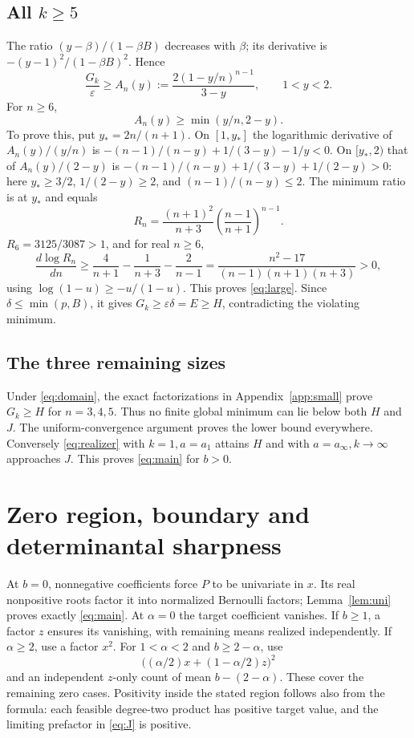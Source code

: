 \documentclass[11pt]{article}
\newcommand{\eps}{\varepsilon}
\begin{document}
\subsection{All $k\ge5$}
The ratio $(y-\beta)/(1-\beta B)$ decreases with $\beta$; its
derivative is $-(y-1)^2/(1-\beta B)^2$. Hence
\[
 \frac{G_k}{\eps}\ge A_n(y):=
 \frac{2(1-y/n)^{n-1}}{3-y},\qquad 1<y<2.
\]
For $n\ge6$,
\begin{equation}\label{eq:large}
 A_n(y)\ge\min(y/n,2-y).
\end{equation}
To prove this, put $y_*=2n/(n+1)$. On $[1,y_*]$ the logarithmic
derivative of $A_n(y)/(y/n)$ is
$-(n-1)/(n-y)+1/(3-y)-1/y<0$.
On $[y_*,2)$ that of $A_n(y)/(2-y)$ is
$-(n-1)/(n-y)+1/(3-y)+1/(2-y)>0$:
here $y_*\ge3/2$, $1/(2-y)\ge2$, and $(n-1)/(n-y)\le2$.
The minimum ratio is at $y_*$ and equals
\[
 R_n=\frac{(n+1)^2}{n+3}
 \left(\frac{n-1}{n+1}\right)^{n-1}.
\]
$R_6=3125/3087>1$, and for real $n\ge6$,
\[
 \frac{d\log R_n}{dn}
 \ge\frac4{n+1}-\frac1{n+3}-\frac2{n-1}
 =\frac{n^2-17}{(n-1)(n+1)(n+3)}>0,
\]
using $\log(1-u)\ge-u/(1-u)$. This proves \eqref{eq:large}.
Since $\delta\le\min(p,B)$, it gives $G_k\ge\eps\delta=E\ge H$,
contradicting the violating minimum.

\subsection{The three remaining sizes}
Under \eqref{eq:domain}, the exact factorizations in
Appendix~\ref{app:small} prove $G_k\ge H$ for $n=3,4,5$.
Thus no finite global minimum can lie below both $H$ and $J$.
The uniform-convergence argument proves the lower bound everywhere.
Conversely \eqref{eq:realizer} with $k=1,a=a_1$ attains $H$ and
with $a=a_\infty,k\to\infty$ approaches $J$.
This proves \eqref{eq:main} for $b>0$.

\section{Zero region, boundary and determinantal sharpness}
At $b=0$, nonnegative coefficients force $P$ to be univariate in $x$.
Its real nonpositive roots factor it into normalized Bernoulli factors;
Lemma~\ref{lem:uni} proves exactly \eqref{eq:main}.
At $\alpha=0$ the target coefficient vanishes. If $b\ge1$, a factor
$z$ ensures its vanishing, with remaining means realized independently.
If $\alpha\ge2$, use a factor $x^2$. For $1<\alpha<2$ and
$b\ge2-\alpha$, use
\[
 \bigl((\alpha/2)x+(1-\alpha/2)z\bigr)^2
\]
and an independent $z$-only count of mean $b-(2-\alpha)$.
These cover the remaining zero cases. Positivity inside the stated
region follows also from the formula: each feasible degree-two product
has positive target value, and the limiting prefactor in \eqref{eq:J}
is positive.
\end{document}

